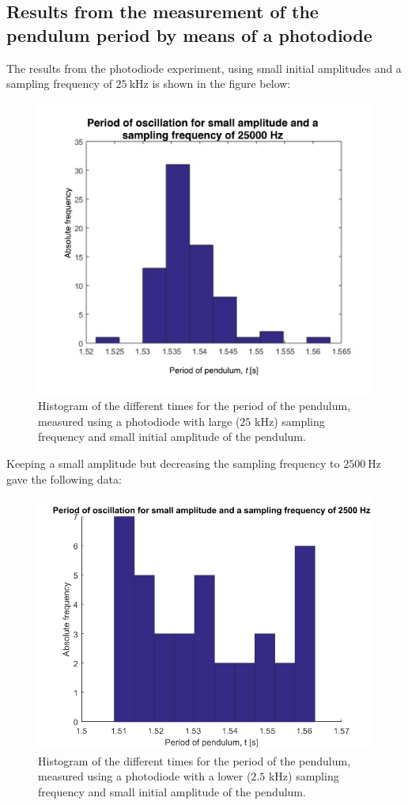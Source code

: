 \documentclass[a4paper, 10pt]{article}
\begin{document}
\subsection{Results from the measurement of the pendulum period by means of a photodiode}
The results from the photodiode experiment, using small initial amplitudes and a sampling frequency of $25\ \mathrm{kHz}$ is shown in the figure below:\newpage
\begin{figure}[ht!]
\centering
\includegraphics[scale=0.7]{Experiment2_3_small_high.pdf}
\caption{Histogram of the different times for the period of the pendulum, measured using a photodiode with large ($25$ kHz) sampling frequency and small initial amplitude of the pendulum.}\label{fig:Experiment_2_3_small_high}
\end{figure}Keeping a small amplitude but decreasing the sampling frequency to $2500 \ \mathrm{Hz}$ gave the following data:\newpage
\begin{figure}[ht!]
\centering
\includegraphics[scale=0.6]{Experiment2_3_small_low.png}
\caption{Histogram of the different times for the period of the pendulum, measured using a photodiode with a lower ($2.5$ kHz) sampling frequency and small initial amplitude of the pendulum.}\label{fig:Experiment_2_3_small_low}
\end{figure}
\end{document}
